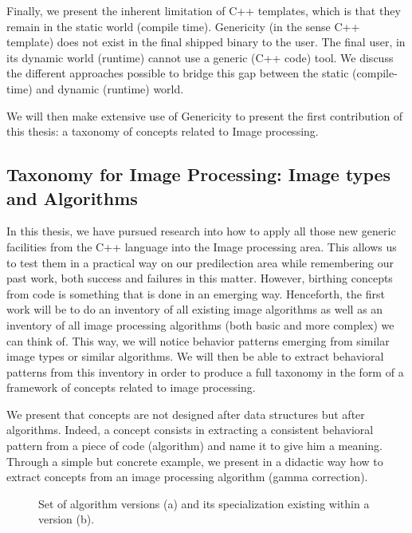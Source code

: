 Finally, we present the inherent limitation of C++ templates, which is that they remain in the static world (compile
time). Genericity (in the sense C++ template) does not exist in the final shipped binary to the user. The final user, in
its dynamic world (runtime) cannot use a generic (C++ code) tool. We discuss the different approaches possible to bridge
this gap between the static (compile-time) and dynamic (runtime) world.

We will then make extensive use of Genericity to present the first contribution of this thesis: a taxonomy of concepts
related to Image processing.


\subsection*{Taxonomy for Image Processing: Image types and Algorithms}


In this thesis, we have pursued research into how to apply all those new generic facilities from the C++ language into
the Image processing area. This allows us to test them in a practical way on our predilection area while remembering our
past work, both success and failures in this matter. However, birthing concepts from code is something that is done in an
emerging way. Henceforth, the first work will be to do an inventory of all existing image algorithms as well as an
inventory of all image processing algorithms (both basic and more complex) we can think of. This way, we will notice
behavior patterns emerging from similar image types or similar algorithms. We will then be able to extract behavioral
patterns from this inventory in order to produce a full taxonomy in the form of a framework of concepts related to image
processing.

We present that concepts are not designed after data structures but after algorithms. Indeed, a concept
consists in extracting a consistent behavioral pattern from a piece of code (algorithm) and name it to give him a
meaning. Through a simple but concrete example, we present in a didactic way how to extract concepts from an image
processing algorithm (gamma correction).

\begin{figure}[htbp]
  \centering
  \hfil
  \caption[]{Set of algorithm versions (a) and its specialization existing within a version (b).}
  \label{summary:fig:image.version.vs.specialization}
\end{figure}

